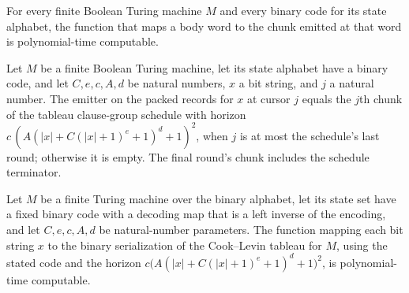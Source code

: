 \begin{lemma}
\label{Complexity.clA5Emit_native}
\leanok
{}
For every finite Boolean Turing machine $M$ and every binary code for its state
alphabet, the function that maps a body word to the chunk emitted at that word is
polynomial-time computable.
\end{lemma}

\begin{lemma}
\label{Complexity.clA5Emit_exact}
\leanok
{}
Let $M$ be a finite Boolean Turing machine, let its state alphabet have a binary code,
and let $C,e,c,A,d$ be natural numbers, $x$ a bit string, and $j$ a natural number. The
emitter on the packed records for $x$ at cursor $j$ equals the $j$th chunk of the
tableau clause-group schedule with horizon $c\,(A(|x|+C(|x|+1)^e+1)^d+1)^2$, when $j$ is
at most the schedule's last round; otherwise it is empty. The final round's chunk
includes the schedule terminator.
\end{lemma}

\begin{lemma}
\label{Complexity.clA5OutputIdentity}
\leanok
{}
Let $M$ be a finite Turing machine over the binary alphabet, let its state set have a
fixed binary code with a decoding map that is a left inverse of the encoding, and let
$C,e,c,A,d$ be natural-number parameters. The function mapping each bit string $x$ to
the binary serialization of the Cook--Levin tableau for $M$, using the stated code and
the horizon $c\bigl(A(|x|+C(|x|+1)^e+1)^d+1\bigr)^2$, is polynomial-time computable.
\end{lemma}

